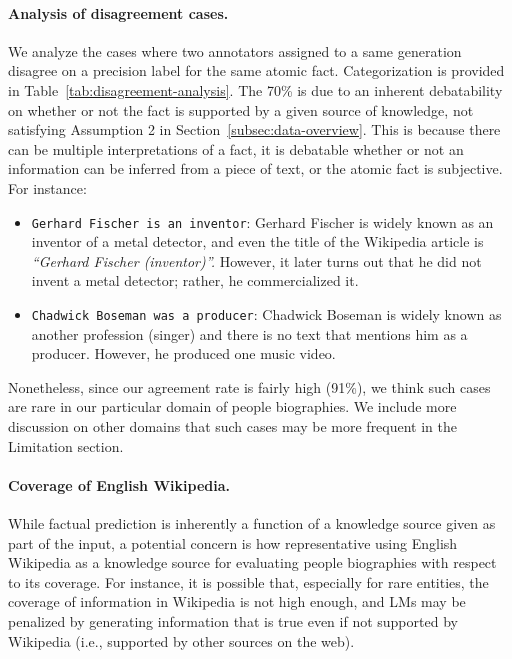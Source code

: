\paragraph{Analysis of disagreement cases.}
We analyze the cases where two annotators assigned to a same generation disagree on a precision label for the same atomic fact. Categorization is provided in Table~\ref{tab:disagreement-analysis}. The 70\% is due to an inherent debatability on whether or not the fact is supported by a given source of knowledge, not satisfying Assumption 2 in Section~\ref{subsec:data-overview}.
This is because there can be multiple interpretations of a fact, it is debatable whether or not an information can be inferred from a piece of text, or the atomic fact is subjective. For instance:\vspace{-.3em}
\begin{itemize}[leftmargin=15pt]\itemsep -.2em
    \item \texttt{Gerhard Fischer is an inventor}: Gerhard Fischer is widely known as an inventor of a metal detector, and even the title of the Wikipedia article is \emph{``Gerhard Fischer (inventor)''.}
    However, it later turns out that he did not invent a metal detector; rather, he commercialized it.
    \item \texttt{Chadwick Boseman was a producer}: Chadwick Boseman is widely known as another profession (singer) and there is no text that mentions him as a producer. However, he produced one music video.
\end{itemize}
Nonetheless, since our agreement rate is fairly high (91\%), we think such cases are rare in our particular domain of people biographies. We include more discussion on other domains that such cases may be more frequent in the Limitation section.


\paragraph{Coverage of English Wikipedia.}
While factual prediction is inherently a function of a knowledge source given as part of the input, a potential concern is how representative using English Wikipedia as a knowledge source for evaluating people biographies with respect to its coverage. For instance, it is possible that, especially for rare entities, the coverage of information in Wikipedia is not high enough, and LMs may be penalized by generating information that is true even if not supported by Wikipedia (i.e., supported by other sources on the web).

